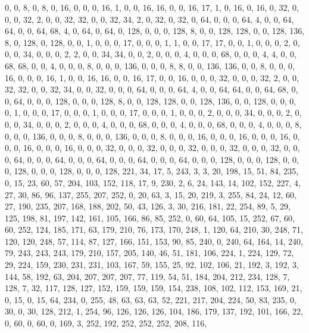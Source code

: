 \begin{DoxyCode}
       0, 0, 8, 0, 8, 0, 16, 0, 0, 0, 16, 1, 0, 0, 16, 16, 0, 0, 16, 17, 1, 0, 16, 0, 16, 0, 32, 0, 0, 0, 32, 2, 0,
       0, 32, 32, 0, 0, 32, 34, 2, 0, 32, 0, 32, 0, 64, 0, 0, 0, 64, 4, 0, 0, 64, 64, 0, 0, 64, 68, 4, 0, 64, 0,
       64, 0, 128, 0, 0, 0, 128, 8, 0, 0, 128, 128, 0, 0, 128, 136, 8, 0, 128, 0, 128, 0, 0, 1, 0, 0, 0, 17, 0, 0,
       0, 1, 1, 0, 0, 17, 17, 0, 0, 1, 0, 0, 0, 2, 0, 0, 0, 34, 0, 0, 0, 2, 2, 0, 0, 34, 34, 0, 0, 2, 0, 0, 0, 4, 0,
       0, 0, 68, 0, 0, 0, 4, 4, 0, 0, 68, 68, 0, 0, 4, 0, 0, 0, 8, 0, 0, 0, 136, 0, 0, 0, 8, 8, 0, 0, 136, 136, 0,
       0, 8, 0, 0, 0, 16, 0, 0, 0, 16, 1, 0, 0, 16, 16, 0, 0, 16, 17, 0, 0, 16, 0, 0, 0, 32, 0, 0, 0, 32, 2, 0, 0,
       32, 32, 0, 0, 32, 34, 0, 0, 32, 0, 0, 0, 64, 0, 0, 0, 64, 4, 0, 0, 64, 64, 0, 0, 64, 68, 0, 0, 64, 0, 0, 0,
       128, 0, 0, 0, 128, 8, 0, 0, 128, 128, 0, 0, 128, 136, 0, 0, 128, 0, 0, 0, 0, 1, 0, 0, 0, 17, 0, 0, 0, 1, 0,
       0, 0, 17, 0, 0, 0, 1, 0, 0, 0, 2, 0, 0, 0, 34, 0, 0, 0, 2, 0, 0, 0, 34, 0, 0, 0, 2, 0, 0, 0, 4, 0, 0, 0,
       68, 0, 0, 0, 4, 0, 0, 0, 68, 0, 0, 0, 4, 0, 0, 0, 8, 0, 0, 0, 136, 0, 0, 0, 8, 0, 0, 0, 136, 0, 0, 0, 8, 0, 0,
       0, 16, 0, 0, 0, 16, 0, 0, 0, 16, 0, 0, 0, 16, 0, 0, 0, 16, 0, 0, 0, 32, 0, 0, 0, 32, 0, 0, 0, 32, 0, 0, 0,
       32, 0, 0, 0, 32, 0, 0, 0, 64, 0, 0, 0, 64, 0, 0, 0, 64, 0, 0, 0, 64, 0, 0, 0, 64, 0, 0, 0, 128, 0, 0, 0,
       128, 0, 0, 0, 128, 0, 0, 0, 128, 0, 0, 0, 128, 221, 34, 17, 5, 243, 3, 3, 20, 198, 15, 51, 84, 235, 0, 15, 23,
       60, 57, 204, 103, 152, 118, 17, 9, 230, 2, 6, 24, 143, 14, 102, 152, 227, 4, 27, 30, 86, 96, 137, 255, 207,
       252, 0, 20, 63, 3, 15, 20, 219, 3, 255, 84, 24, 12, 60, 27, 190, 235, 207, 168, 188, 202, 50, 43, 126, 3,
       30, 216, 181, 22, 254, 89, 5, 29, 125, 198, 81, 197, 142, 161, 105, 166, 86, 85, 252, 0, 60, 64, 105, 15, 252,
       67, 60, 60, 252, 124, 185, 171, 63, 179, 210, 76, 173, 170, 248, 1, 120, 64, 210, 30, 248, 71, 120, 120,
       248, 57, 114, 87, 127, 166, 151, 153, 90, 85, 240, 0, 240, 64, 164, 14, 240, 79, 243, 243, 243, 179, 210, 157,
       205, 140, 46, 51, 181, 106, 224, 1, 224, 129, 72, 29, 224, 159, 230, 231, 231, 103, 167, 59, 155, 25, 92,
       102, 106, 21, 192, 3, 192, 3, 144, 58, 192, 63, 204, 207, 207, 207, 77, 119, 54, 51, 184, 204, 212, 234, 128,
       7, 128, 7, 32, 117, 128, 127, 152, 159, 159, 159, 154, 238, 108, 102, 112, 153, 169, 21, 0, 15, 0, 15, 64,
       234, 0, 255, 48, 63, 63, 63, 52, 221, 217, 204, 224, 50, 83, 235, 0, 30, 0, 30, 128, 212, 1, 254, 96, 126,
       126, 126, 104, 186, 179, 137, 192, 101, 166, 22, 0, 60, 0, 60, 0, 169, 3, 252, 192, 252, 252, 252, 208, 116,

\end{DoxyCode}
